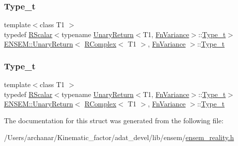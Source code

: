 \subsubsection{\texorpdfstring{Type\_t}{Type\_t}\hspace{0.1cm}{\footnotesize\ttfamily [1/2]}}
{\footnotesize\ttfamily template$<$class T1 $>$ \\
typedef \mbox{\hyperlink{classENSEM_1_1RScalar}{R\+Scalar}}$<$typename \mbox{\hyperlink{structENSEM_1_1UnaryReturn}{Unary\+Return}}$<$T1, \mbox{\hyperlink{structENSEM_1_1FnVariance}{Fn\+Variance}}$>$\+::\mbox{\hyperlink{structENSEM_1_1UnaryReturn_3_01RComplex_3_01T1_01_4_00_01FnVariance_01_4_a85d25582f2c509cb70b5b53ff50ee7ce}{Type\+\_\+t}}$>$ \mbox{\hyperlink{structENSEM_1_1UnaryReturn}{E\+N\+S\+E\+M\+::\+Unary\+Return}}$<$ \mbox{\hyperlink{classENSEM_1_1RComplex}{R\+Complex}}$<$ T1 $>$, \mbox{\hyperlink{structENSEM_1_1FnVariance}{Fn\+Variance}} $>$\+::\mbox{\hyperlink{structENSEM_1_1UnaryReturn_3_01RComplex_3_01T1_01_4_00_01FnVariance_01_4_a85d25582f2c509cb70b5b53ff50ee7ce}{Type\+\_\+t}}}

\mbox{\label{structENSEM_1_1UnaryReturn_3_01RComplex_3_01T1_01_4_00_01FnVariance_01_4_a85d25582f2c509cb70b5b53ff50ee7ce}} 
\subsubsection{\texorpdfstring{Type\_t}{Type\_t}\hspace{0.1cm}{\footnotesize\ttfamily [2/2]}}
{\footnotesize\ttfamily template$<$class T1 $>$ \\
typedef \mbox{\hyperlink{classENSEM_1_1RScalar}{R\+Scalar}}$<$typename \mbox{\hyperlink{structENSEM_1_1UnaryReturn}{Unary\+Return}}$<$T1, \mbox{\hyperlink{structENSEM_1_1FnVariance}{Fn\+Variance}}$>$\+::\mbox{\hyperlink{structENSEM_1_1UnaryReturn_3_01RComplex_3_01T1_01_4_00_01FnVariance_01_4_a85d25582f2c509cb70b5b53ff50ee7ce}{Type\+\_\+t}}$>$ \mbox{\hyperlink{structENSEM_1_1UnaryReturn}{E\+N\+S\+E\+M\+::\+Unary\+Return}}$<$ \mbox{\hyperlink{classENSEM_1_1RComplex}{R\+Complex}}$<$ T1 $>$, \mbox{\hyperlink{structENSEM_1_1FnVariance}{Fn\+Variance}} $>$\+::\mbox{\hyperlink{structENSEM_1_1UnaryReturn_3_01RComplex_3_01T1_01_4_00_01FnVariance_01_4_a85d25582f2c509cb70b5b53ff50ee7ce}{Type\+\_\+t}}}



The documentation for this struct was generated from the following file\+:\begin{DoxyCompactItemize}
\item 
/\+Users/archanar/\+Kinematic\+\_\+factor/adat\+\_\+devel/lib/ensem/\mbox{\hyperlink{lib_2ensem_2ensem__reality_8h}{ensem\+\_\+reality.\+h}}\end{DoxyCompactItemize}
